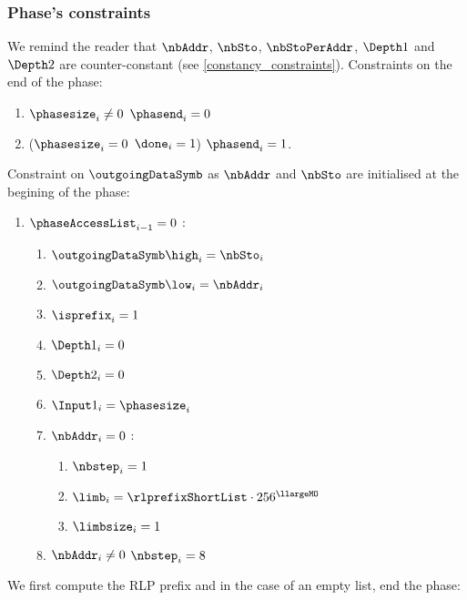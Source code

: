 \subsubsection{Phase's constraints}
We remind the reader that $\nbAddr$, $\nbSto$, $\nbStoPerAddr$, $\Depth1$ and $\Depth2$ are counter-constant (see \ref{constancy_constraints}).
\newline
Constraints on the end of the phase:
\begin{enumerate}
	\item \If $\phasesize_{i} \neq 0$ \Then $\phasend_{i}=0$
	\item\label{constraint: end of access set phase} \If ($\phasesize_{i}=0$ \et $\done_{i}=1$) \Then $\phasend_{i}=1$.
\end{enumerate}
Constraint on $\outgoingDataSymb$ as $\nbAddr$ and $\nbSto$ are initialised at the begining of the phase:
\begin{enumerate}[resume]
    \item \If $\phaseAccessList_{i-1}=0$ \Then:
    \begin{enumerate}
        \item $\outgoingDataSymb\high_{i}=\nbSto_{i}$
        \item $\outgoingDataSymb\low_{i}=\nbAddr_{i}$
		\item $\isprefix_{i}=1$
		\item $\Depth1_{i} = 0$
		\item $\Depth2_{i} = 0$
		\item $\Input1_{i} = \phasesize_{i}$
		\item \If $\nbAddr_{i}=0$ \Then: 
		\begin{enumerate}
			\item $\nbstep_{i}=1$
			\item $\limb_{i}=\rlprefixShortList \cdot 256 ^{\llargeMO}$
			\item $\limbsize_{i}=1$
		\end{enumerate}
		\item \If $\nbAddr_{i} \neq 0$ \Then $\nbstep_{i}=8$
    \end{enumerate} 
\end{enumerate}
We first compute the RLP prefix and in the case of an empty list, end the phase:
